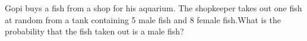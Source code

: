 Gopi buys a fish from a shop for his aquarium. The
shopkeeper takes out one fish at random from a
tank containing 5 male fish and 8 female fish.What is the probability that the fish taken
out is a male fish?
